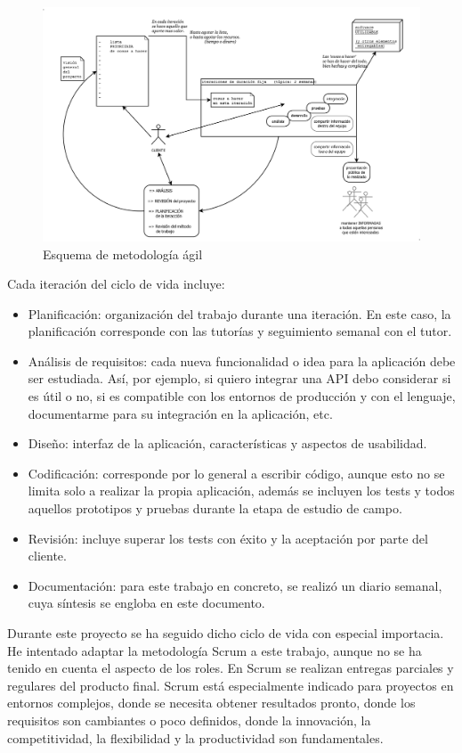 \begin{figure}[H]
	\centering
	\includegraphics[width=\textwidth]{./images/metodologia-agil.png}
	\caption{Esquema de metodología ágil} \label{fig:metodologia}
\end{figure}

\vspace*{0.1in}
Cada iteración del ciclo de vida incluye:
\begin{itemize}
	\item Planificación: organización del trabajo durante una iteración. En este caso, la planificación corresponde con las tutorías y seguimiento semanal con el tutor.
	\item Análisis de requisitos: cada nueva funcionalidad o idea para la aplicación debe ser estudiada. Así, por ejemplo, si quiero integrar una API debo considerar si es útil o no, si es compatible con los entornos de producción y con el lenguaje, documentarme para su integración en la aplicación, etc.
	\item Diseño: interfaz de la aplicación, características y aspectos de usabilidad.
	\item Codificación: corresponde por lo general a escribir código, aunque esto no se limita solo a realizar la propia aplicación, además se incluyen los tests y todos aquellos prototipos y pruebas durante la etapa de estudio de campo.
	\item Revisión: incluye superar los tests con éxito y la aceptación por parte del cliente.
	\item Documentación: para este trabajo en concreto, se realizó un diario semanal, cuya síntesis se engloba en este documento.
\end{itemize}

Durante este proyecto se ha seguido dicho ciclo de vida con especial importacia. He intentado adaptar la metodología Scrum a este trabajo, aunque no se ha tenido en cuenta  el aspecto de los roles. En Scrum se realizan entregas parciales y regulares del producto final. Scrum está especialmente indicado para proyectos en entornos complejos, donde se necesita obtener resultados pronto, donde los requisitos son cambiantes o poco definidos, donde la innovación, la competitividad, la flexibilidad y la productividad son fundamentales. \\

